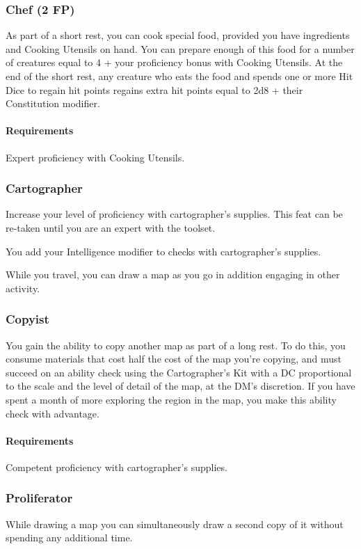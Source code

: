 \subsubsection{Chef (2 FP)} \label{feat::chef}
    As part of a short rest, you can cook special food, provided you have ingredients and Cooking Utensils on hand.
    You can prepare enough of this food for a number of creatures equal to 4 + your proficiency bonus with Cooking Utensils.
    At the end of the short rest, any creature who eats the food and spends one or more Hit Dice to regain hit points regains extra hit points equal to 2d8 + their Constitution modifier.
    \paragraph{Requirements} Expert proficiency with Cooking Utensils.

\subsubsection{Cartographer} \label{feat::cartographer}
    Increase your level of proficiency with cartographer's supplies.
    This feat can be re-taken until you are an expert with the toolset.

    You add your Intelligence modifier to checks with cartographer's supplies.

    While you travel, you can draw a map as you go in addition engaging in other activity.
\subsubsection{Copyist} \label{feat::copyist}
    You gain the ability to copy another map as part of a long rest.
    To do this, you consume materials that cost half the cost of the map you're copying, and must succeed on an ability check using the Cartographer's Kit with a DC proportional to the scale and the level of detail of the map, at the DM's discretion.
    If you have spent a month of more exploring the region in the map, you make this ability check with advantage.
    \paragraph{Requirements} Competent proficiency with cartographer's supplies.
\subsubsection{Proliferator} \label{feat::proliferator}
    While drawing a map you can simultaneously draw a second copy of it without spending any additional time.
